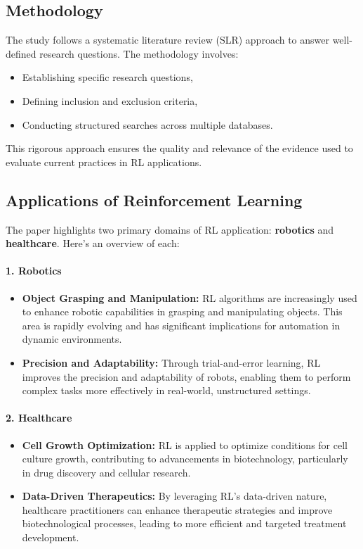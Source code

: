 \subsection*{Methodology}
The study follows a systematic literature review (SLR) approach to answer well-defined research questions. The methodology involves:
\begin{itemize}
    \item Establishing specific research questions,
    \item Defining inclusion and exclusion criteria,
    \item Conducting structured searches across multiple databases.
\end{itemize}
This rigorous approach ensures the quality and relevance of the evidence used to evaluate current practices in RL applications.

\subsection*{Applications of Reinforcement Learning}
The paper highlights two primary domains of RL application: \textbf{robotics} and \textbf{healthcare}. Here's an overview of each:

\paragraph{1. Robotics}
\begin{itemize}
    \item \textbf{Object Grasping and Manipulation:} RL algorithms are increasingly used to enhance robotic capabilities in grasping and manipulating objects. This area is rapidly evolving and has significant implications for automation in dynamic environments.
    \item \textbf{Precision and Adaptability:} Through trial-and-error learning, RL improves the precision and adaptability of robots, enabling them to perform complex tasks more effectively in real-world, unstructured settings.
\end{itemize}

\paragraph{2. Healthcare}
\begin{itemize}
    \item \textbf{Cell Growth Optimization:} RL is applied to optimize conditions for cell culture growth, contributing to advancements in biotechnology, particularly in drug discovery and cellular research.
    \item \textbf{Data-Driven Therapeutics:} By leveraging RL's data-driven nature, healthcare practitioners can enhance therapeutic strategies and improve biotechnological processes, leading to more efficient and targeted treatment development.
\end{itemize}

